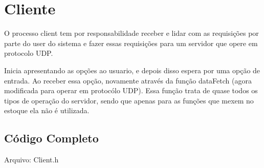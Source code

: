 \documentclass[10pt,a4paper]{report}
\begin{document}
\chapter{Cliente}

O processo client tem por responsabilidade receber e lidar com as requisições por parte do user do sistema e fazer essas requisições para um servidor que opere em protocolo UDP.

	Inicia apresentando as opções ao usuario, e depois disso espera por uma opção de entrada. Ao receber essa opção, novamente através da função dataFetch (agora modificada para operar em protocólo UDP). Essa função trata de quase todos os tipos de operação do servidor, sendo que apenas para as funções que mexem no estoque ela não é utilizada.

\section*{Código Completo}
\begin{center}
Arquivo: Client.h
\end{center}
\end{document}
